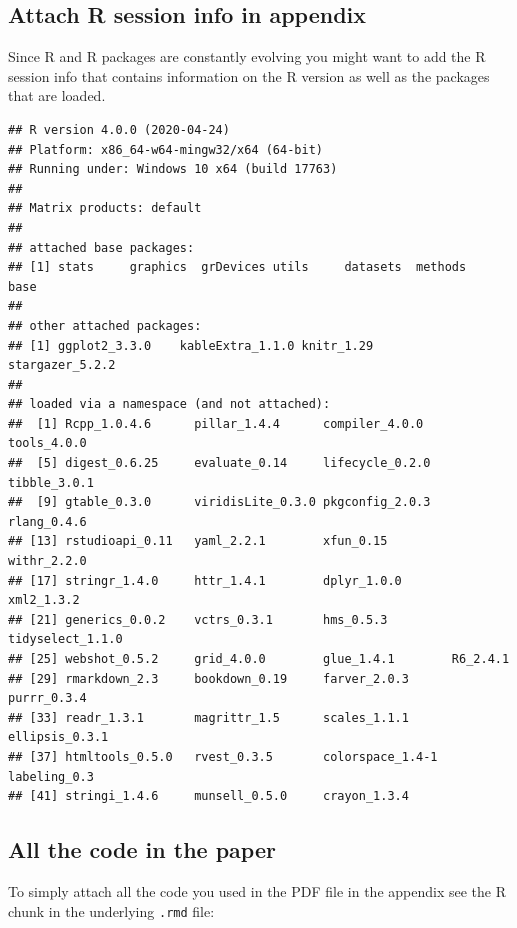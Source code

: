 \documentclass[
  12pt,
]{article}
\begin{document}
\hypertarget{sec:rsessioninfo}{%
\subsection{Attach R session info in appendix}\label{sec:rsessioninfo}}

Since R and R packages are constantly evolving you might want to add the R session info that contains information on the R version as well as the packages that are loaded.

\begin{verbatim}
## R version 4.0.0 (2020-04-24)
## Platform: x86_64-w64-mingw32/x64 (64-bit)
## Running under: Windows 10 x64 (build 17763)
## 
## Matrix products: default
## 
## attached base packages:
## [1] stats     graphics  grDevices utils     datasets  methods   base     
## 
## other attached packages:
## [1] ggplot2_3.3.0    kableExtra_1.1.0 knitr_1.29       stargazer_5.2.2 
## 
## loaded via a namespace (and not attached):
##  [1] Rcpp_1.0.4.6      pillar_1.4.4      compiler_4.0.0    tools_4.0.0      
##  [5] digest_0.6.25     evaluate_0.14     lifecycle_0.2.0   tibble_3.0.1     
##  [9] gtable_0.3.0      viridisLite_0.3.0 pkgconfig_2.0.3   rlang_0.4.6      
## [13] rstudioapi_0.11   yaml_2.2.1        xfun_0.15         withr_2.2.0      
## [17] stringr_1.4.0     httr_1.4.1        dplyr_1.0.0       xml2_1.3.2       
## [21] generics_0.0.2    vctrs_0.3.1       hms_0.5.3         tidyselect_1.1.0 
## [25] webshot_0.5.2     grid_4.0.0        glue_1.4.1        R6_2.4.1         
## [29] rmarkdown_2.3     bookdown_0.19     farver_2.0.3      purrr_0.3.4      
## [33] readr_1.3.1       magrittr_1.5      scales_1.1.1      ellipsis_0.3.1   
## [37] htmltools_0.5.0   rvest_0.3.5       colorspace_1.4-1  labeling_0.3     
## [41] stringi_1.4.6     munsell_0.5.0     crayon_1.3.4
\end{verbatim}

\hypertarget{all-the-code-in-the-paper}{%
\subsection{All the code in the paper}\label{all-the-code-in-the-paper}}

To simply attach all the code you used in the PDF file in the appendix see the R chunk in the underlying \texttt{.rmd} file:
\end{document}
